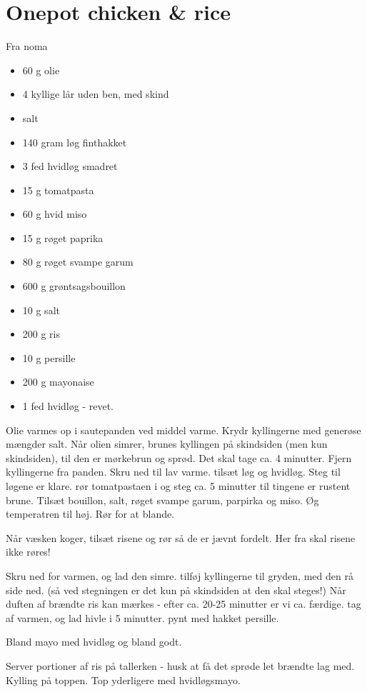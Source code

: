 \documentclass[
]{book}
\begin{document}
\hypertarget{onepot-chicken-rice}{%
\section{Onepot chicken \& rice}\label{onepot-chicken-rice}}

Fra noma

\begin{itemize}
\item
  60 g olie
\item
  4 kyllige lår uden ben, med skind
\item
  salt
\item
  140 gram løg finthakket
\item
  3 fed hvidløg smadret
\item
  15 g tomatpasta
\item
  60 g hvid miso
\item
  15 g røget paprika
\item
  80 g røget svampe garum
\item
  600 g grøntsagsbouillon
\item
  10 g salt
\item
  200 g ris
\item
  10 g persille
\item
  200 g mayonaise
\item
  1 fed hvidløg - revet.
\end{itemize}

Olie varmes op i sautepanden ved middel varme. Krydr kyllingerne med generøse
mængder salt. Når olien simrer, brunes kyllingen på skindsiden (men kun skindsiden),
til den er mørkebrun og sprød. Det skal tage ca. 4 minutter.
Fjern kyllingerne fra panden. Skru ned til lav varme.
tilsæt løg og hvidløg. Steg til løgene er klare.
rør tomatpastaen i og steg ca. 5 minutter til tingene er rustent brune.
Tilsæt bouillon, salt, røget svampe garum, parpirka og miso. Øg temperatren til høj. Rør for at
blande.

Når væsken koger, tilsæt risene og rør så de er jævnt fordelt. Her fra skal risene ikke røres!

Skru ned for varmen, og lad den simre. tilføj kyllingerne til gryden, med den rå side ned. (så ved stegningen
er det kun på skindsiden at den skal steges!) Når duften af brændte ris kan mærkes - efter ca. 20-25 minutter
er vi ca. færdige. tag af varmen, og lad hivle i 5 minutter. pynt med hakket persille.

Bland mayo med hvidløg og bland godt.

Server portioner af ris på tallerken - husk at få det sprøde let brændte lag med. Kylling på toppen.
Top yderligere med hvidløgsmayo.
\end{document}
